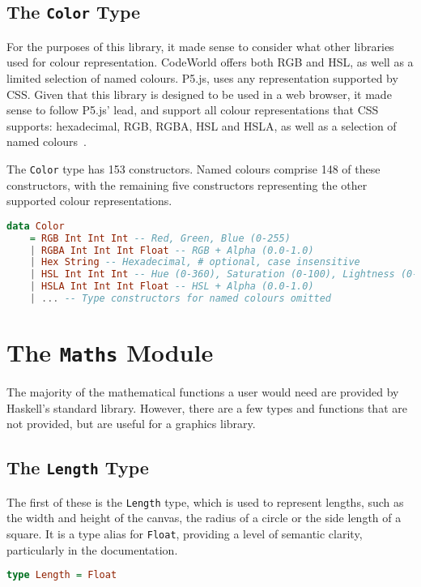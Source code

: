 \documentclass[../main.tex]{subfiles}
\begin{document}
        \subsection{The \texttt{Color}
            Type} For the purposes of this library, it made sense to consider what other
                libraries used for colour representation.
            CodeWorld offers both RGB and HSL, as well as a limited selection of named
                colours.
            P5.js, uses any representation supported by CSS.
            Given that this library is designed to be used in a web browser, it made sense
                to follow P5.js' lead, and support all colour representations that CSS
                supports: hexadecimal, RGB, RGBA, HSL and HSLA, as well as a selection of named
                colours~\citep{cssColours}.

            The \texttt{Color} type has 153 constructors.
            Named colours comprise 148 of these constructors, with the remaining five
                constructors representing the other supported colour representations.

            \begin{lstlisting}[language={Haskell}, label={lst:color}, caption={The \texttt{Color} 
                type definition.
                Named colours have been omitted, but are included in the actual implementation (see 
                Appendix~\ref{app:code}).}]
data Color
    = RGB Int Int Int -- Red, Green, Blue (0-255)
    | RGBA Int Int Int Float -- RGB + Alpha (0.0-1.0)
    | Hex String -- Hexadecimal, # optional, case insensitive
    | HSL Int Int Int -- Hue (0-360), Saturation (0-100), Lightness (0-100)
    | HSLA Int Int Int Float -- HSL + Alpha (0.0-1.0)
    | ... -- Type constructors for named colours omitted\end{lstlisting}

    \section{The \texttt{Maths}
        Module} The majority of the mathematical functions a user would need are
            provided by Haskell's standard library.
        However, there are a few types and functions that are not provided, but are
            useful for a graphics library.

        \subsection{The \texttt{Length}
            Type} The first of these is the \texttt{Length} type, which is used to
                represent lengths, such as the width and height of the canvas, the radius of a
                circle or the side length of a square.
            It is a type alias for \texttt{Float}, providing a level of semantic clarity,
                particularly in the documentation.
            \begin{lstlisting}[language={Haskell}, label={lst:length}, caption={The \texttt{Length} 
                type definition.}]
type Length = Float\end{lstlisting}
\end{document}
